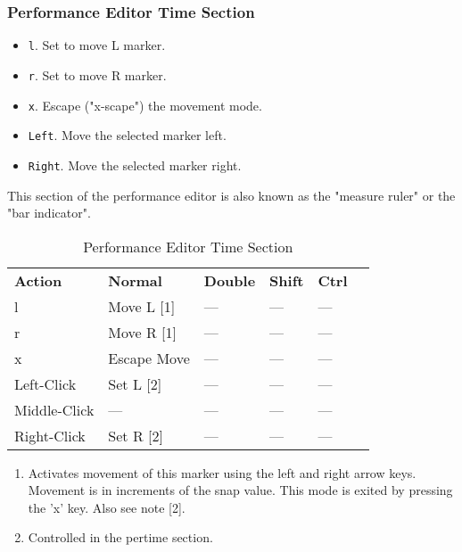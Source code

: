 \subsubsection{Performance Editor Time Section}
\label{subsubsec:kbd_mouse_performance_editor_time_section}

   \begin{itemize}
      \item \texttt{l}.  Set to move L marker.
      \item \texttt{r}.  Set to move R marker.
      \item \texttt{x}.  Escape ("x-scape") the movement mode.
      \item \texttt{Left}.  Move the selected marker left.
      \item \texttt{Right}.  Move the selected marker right.
   \end{itemize}

   This section of the performance editor is also known as the "measure ruler"
   or the "bar indicator".

   \begin{table}[H]
      \centering
      \caption{Performance Editor Time Section}
      \label{table:performance_editor_time_section}
      \begin{tabular}{l l l l l l}
         \textbf{Action}   & \textbf{Normal} & \textbf{Double}    & \textbf{Shift} & \textbf{Ctrl}   \\
         l                 & Move L [1]      & ---                & ---            & ---             \\
         r                 & Move R [1]      & ---                & ---            & ---             \\
         x                 & Escape Move     & ---                & ---            & ---             \\
         Left-Click        & Set L [2]       & ---                & ---            & ---             \\
         Middle-Click      & ---             & ---                & ---            & ---             \\
         Right-Click       & Set R [2]       & ---                & ---            & ---             \\
      \end{tabular}
   \end{table}

   \begin{enumerate}
      \item Activates movement of this marker using the left and right arrow
         keys.  Movement is in increments of the snap value.  This mode is
         exited by pressing the 'x' key.  Also see note [2].
      \item Controlled in the pertime section.
   \end{enumerate}

